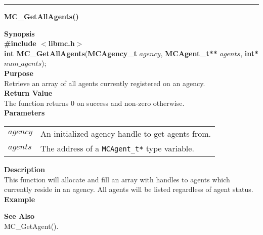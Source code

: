 \noindent
\vspace{5pt}
\rule{6.5in}{0.015in}
\noindent
{}
{\LARGE \bf MC\_GetAllAgents()}\\
\label{api:MC_GetAllAgents()}

\noindent
{\bf Synopsis}\\
{\bf \#include $<$libmc.h$>$}\\
{\bf int MC\_GetAllAgents}({\bf MCAgency\_t} $agency$, {\bf MCAgent\_t**} $agents$, {\bf int*} $num\_agents$);\\

\noindent
{\bf Purpose}\\
Retrieve an array of all agents currently registered on an agency. \\

\noindent
{\bf Return Value}\\
The function returns 0 on success and non-zero otherwise.\\

\noindent
{\bf Parameters}
\vspace{-0.1in}
\begin{description}
\item
\begin{tabular}{p{10 mm}p{145 mm}} 
$agency$ & An initialized agency handle to get agents from.\\
$agents$ & The address of a \texttt{MCAgent\_t*} type variable.
\end{tabular}
\end{description}

\noindent
{\bf Description}\\
This function will allocate and fill an array with handles to 
agents which currently reside in an agency. All agents will be listed
regardless of agent status. \\

\noindent
{\bf Example}\\
\noindent

\noindent
{\bf See Also}\\
MC\_GetAgent().

